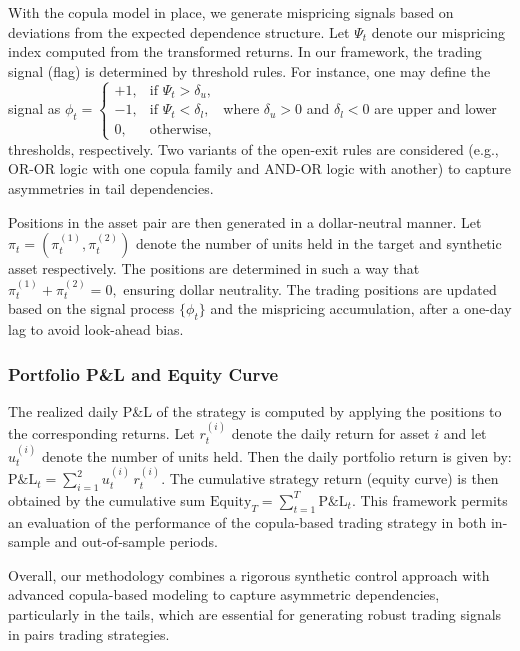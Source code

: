 With the copula model in place, we generate mispricing signals based on deviations from the expected dependence structure. Let $\Psi_t$ denote our mispricing index computed from the transformed returns. In our framework, the trading signal (flag) is determined by threshold rules. For instance, one may define the signal as
$
\phi_t = \begin{cases}
+1, & \text{if } \Psi_t > \delta_u, \\
-1, & \text{if } \Psi_t < \delta_l, \\
0, & \text{otherwise},
\end{cases}
$
where $\delta_u>0$ and $\delta_l<0$ are upper and lower thresholds, respectively. Two variants of the open-exit rules are considered (e.g., OR-OR logic with one copula family and AND-OR logic with another) to capture asymmetries in tail dependencies.

Positions in the asset pair are then generated in a dollar-neutral manner. Let
$
\pi_t = (\pi_t^{(1)},\pi_t^{(2)})
$
denote the number of units held in the target and synthetic asset respectively. The positions are determined in such a way that
$
\pi_t^{(1)} + \pi_t^{(2)} = 0,
$
ensuring dollar neutrality. The trading positions are updated based on the signal process $\{\phi_t\}$ and the mispricing accumulation, after a one-day lag to avoid look-ahead bias.

\subsubsection*{Portfolio P\&L and Equity Curve}

The realized daily P\&L of the strategy is computed by applying the positions to the corresponding returns. Let $r_t^{(i)}$ denote the daily return for asset $i$ and let $u_t^{(i)}$ denote the number of units held. Then the daily portfolio return is given by:
$
\text{P\&L}_t = \sum_{i=1}^{2} u_t^{(i)}\,r_t^{(i)}.
$
The cumulative strategy return (equity curve) is then obtained by the cumulative sum
$
\text{Equity}_T = \sum_{t=1}^{T} \text{P\&L}_t.
$
This framework permits an evaluation of the performance of the copula-based trading strategy in both in-sample and out-of-sample periods.

\medskip

Overall, our methodology combines a rigorous synthetic control approach with advanced copula-based modeling to capture asymmetric dependencies, particularly in the tails, which are essential for generating robust trading signals in pairs trading strategies.



